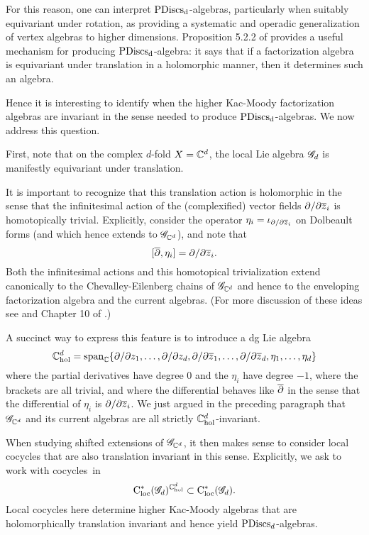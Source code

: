 For this reason, one can interpret ${\rm PDiscs_d}$-algebras, particularly when suitably equivariant under rotation, as providing a systematic and operadic generalization of vertex algebras to higher dimensions. 
Proposition 5.2.2 of \cite{CG1} provides a useful mechanism for producing ${\rm PDiscs_d}$-algebra: 
it says that if a factorization algebra is equivariant under translation in a holomorphic manner, then it determines such an algebra.

Hence it is interesting to identify when the higher Kac-Moody factorization algebras are invariant in the sense needed to produce ${\rm PDiscs_d}$-algebras.
We now address this question.

First, note that on the complex $d$-fold $X = \CC^d$, 
the local Lie algebra $\sG_{d}$ is manifestly equivariant under translation.

It is important to recognize that this translation action is holomorphic in the sense that the infinitesimal action of the (complexified) vector fields $\partial/\partial \Bar{z}_i$ is homotopically trivial.
Explicitly, consider the operator $\eta_i = \iota_{\partial/\partial \Bar{z}_i}$ on Dolbeault forms
(and which hence extends to $\sG_{\CC^d}$), and
note that
\[
[\dbar, \eta_i] = \partial/\partial \Bar{z}_i.
\]
Both the infinitesimal actions and this homotopical trivialization extend canonically to the Chevalley-Eilenberg chains of $\sG_{\CC^d}$ and hence to the enveloping factorization algebra and the current algebras.
(For more discussion of these ideas see \cite{BWhol} and Chapter 10 of \cite{CG2}.)

A succinct way to express this feature is to introduce a dg Lie algebra  
\[
\CC^d_{\rm hol} = \text{span}_\CC\{\partial/\partial z_1, \ldots, \partial/\partial z_d, \partial/\partial \Bar{z}_1,\ldots,\partial/\partial \Bar{z}_d, \eta_1,\ldots, \eta_d\}
\]
where the partial derivatives have degree 0 and the $\eta_i$ have degree $-1$,
where the brackets are all trivial, 
and where the differential behaves like $\dbar$ in the sense that the differential of $\eta_i$ is $\partial/\partial \Bar{z}_i$.
We just argued in the preceding paragraph that $\sG_{\CC^d}$ and its current algebras are all strictly $\CC^d_{\rm hol}$-invariant. 

When studying shifted extensions of $\sG_{\CC^d}$, 
it then makes sense to consider local cocycles that are also translation invariant in this sense.
Explicitly, we ask to work with cocycles~in
\[
\cloc^*(\sG_{d})^{\CC^d_{\rm hol}} \subset \cloc^*(\sG_{d}).
\]
Local cocycles here determine higher Kac-Moody algebras that are holomorphically translation invariant and hence yield ${\rm PDiscs}_d$-algebras.

